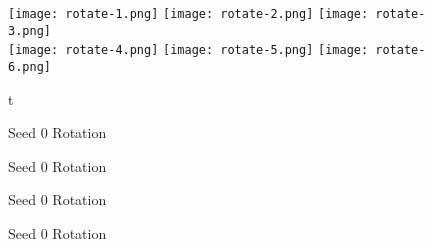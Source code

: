 \begin{figure}
	\centering
	\texttt{[image: rotate-1.png]}
	\texttt{[image: rotate-2.png]}
	\texttt{[image: rotate-3.png]}\\[4pt]
	\texttt{[image: rotate-4.png]}
	\texttt{[image: rotate-5.png]}
	\texttt{[image: rotate-6.png]}
	\caption{t}\label{fig:rotate}
\end{figure}


\begin{figure}[!htbp]
	\caption{Seed 0 Rotation}\label{fig:seed-0-rotate-fps}
\end{figure}

\begin{figure}[!htbp]
	\caption{Seed 0 Rotation}\label{fig:seed-0-rotate-cpu}
\end{figure}

\begin{figure}[!htbp]
	\caption{Seed 0 Rotation}\label{fig:seed-0-rotate-gpu}
\end{figure}

\begin{figure}[!htbp]
	\caption{Seed 0 Rotation}\label{fig:seed-0-rotate-mem}	
\end{figure} 

